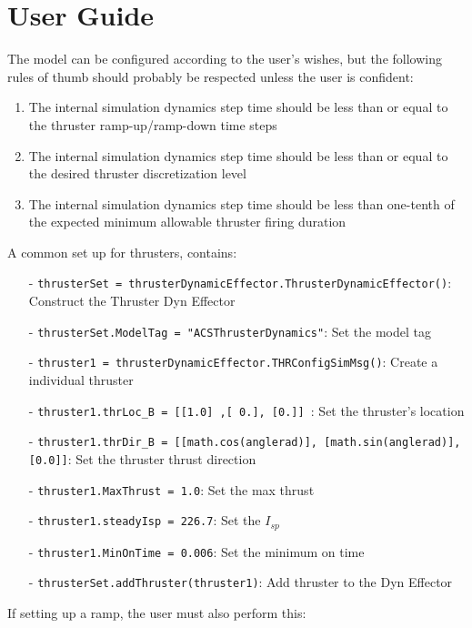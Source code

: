 \section{User Guide}

The model can be configured according to the user's wishes, but the following 
rules of thumb should probably be respected unless the user is confident:
\begin{enumerate}
\item{The internal simulation dynamics step time should be less than or equal 
     to the thruster ramp-up/ramp-down time steps}
\item{The internal simulation dynamics step time should be less than or equal to 
     the desired thruster discretization level}
\item{The internal simulation dynamics step time should be less than one-tenth 
    of the expected minimum allowable thruster firing duration}
\end{enumerate}

A common set up for thrusters, contains:

\begin{itemize}
 \item[-]      \texttt{thrusterSet = thrusterDynamicEffector.ThrusterDynamicEffector()}: Construct the Thruster Dyn Effector
  \item[-]   \texttt{thrusterSet.ModelTag = "ACSThrusterDynamics"}: Set the model tag
   \item[-]    \texttt{thruster1 = thrusterDynamicEffector.THRConfigSimMsg()}: Create a individual thruster
    \item[-] \texttt{thruster1.thrLoc\_B = [[1.0] ,[ 0.], [0.]] }: Set the thruster's location
   \item[-]  \texttt{thruster1.thrDir\_B = [[math.cos(anglerad)], [math.sin(anglerad)], [0.0]]}: Set the thruster thrust direction
  \item[-]   \texttt{thruster1.MaxThrust = 1.0}: Set the max thrust
  \item[-]    \texttt{thruster1.steadyIsp = 226.7}: Set the $I_{sp}$
  \item[-]   \texttt{thruster1.MinOnTime = 0.006}: Set the minimum on time
   \item[-]   \texttt{thrusterSet.addThruster(thruster1)}: Add thruster to the Dyn Effector
\end{itemize}

If setting up a ramp, the user must also perform this:

